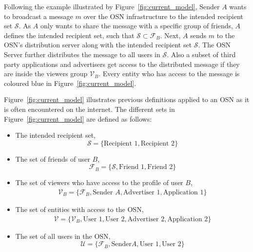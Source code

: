 Following the example illustrated by Figure~\ref{fig:current_model}, Sender $A$ wants to broadcast a message $m$ over the OSN infrastructure to the intended recipient set $\mathcal{S}$. As $A$ only wants to share the message with a specific group of friends, $A$ defines the intended recipient set, such that $\mathcal{S} \subset \mathcal{F}_B$. Next, $A$ sends $m$ to the OSN's distribution server along with the intended recipient set $\mathcal{S}$. The OSN Server further distributes the message to all users in $\mathcal{S}$. Also a subset of third party applications and advertisers get access to the distributed message if they are inside the viewers group $\mathcal{V}_B$. Every entity who has access to the message is coloured blue in Figure~\ref{fig:current_model}.

Figure~\ref{fig:current_model} illustrates previous definitions applied to an OSN as it is often encountered on the internet. The different sets in Figure~\ref{fig:current_model} are defined as follows:
\begin{itemize}
 \item The intended recipient set,
 \begin{equation*}
  \mathcal{S} = \{ \textrm{Recipient 1}, \textrm{Recipient 2} \}
 \end{equation*}
 \item The set of friends of user $B$,
 \begin{equation*}
  \mathcal{F}_B = \{ \mathcal{S}, \textrm{Friend 1}, \textrm{Friend 2} \}
 \end{equation*}
 \item The set of viewers who have access to the profile of user $B$,
 \begin{equation*}
  \begin{split}
   \mathcal{V}_B = \{ \mathcal{F}_B, \textrm{Sender } A, \textrm{Advertiser 1}, \textrm{Application 1} \}
  \end{split}
 \end{equation*}
 \item The set of entities with access to the OSN,
\begin{equation*}
\begin{split}
 \mathcal{V} = \{ \mathcal{V}_B, \textrm{User 1}, \textrm{User 2}, \textrm{Advertiser 2}, \textrm{Application 2} \}
\end{split}
\end{equation*}
\item The set of all users in the OSN,
\begin{equation*}
 \mathcal{U} = \{ \mathcal{F}_B, \textrm{Sender} A, \textrm{User 1}, \textrm{User 2}\}
\end{equation*}
\end{itemize}


